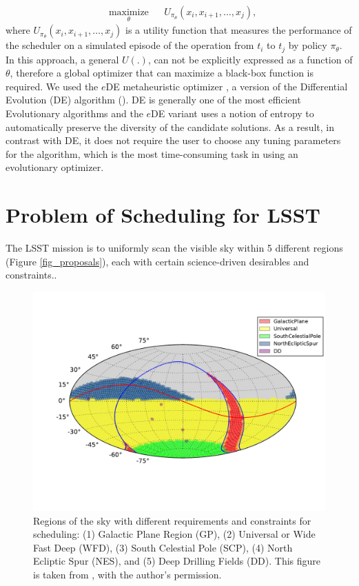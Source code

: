 \documentclass[12pt,aas_macros]{article}
\theoremstyle{definition}
\begin{document}
\begin{equation}%
\begin{aligned}
& \underset{\theta}{\text{maximize}}
& & U_{\pi_{\theta}}(x_i,x_{i+1}, \dots, x_{j}),
\end{aligned}
\end{equation}
where $U_{\pi_{\theta}}(x_i,x_{i+1}, \dots, x_{j})$ is a utility function that measures the performance of the scheduler on a simulated episode of the operation from $t_i$ to $t_j$ by policy $\pi_{\theta}$. In this approach, a general $U(.)$, can not be explicitly expressed as a function of $\theta$, therefore a global optimizer that can maximize a black-box function is required. We used the $e$DE metaheuristic optimizer \cite{naghib2016entropic}, a version of the Differential Evolution (DE) algorithm (\cite{storn1997differential}). DE is generally one of the most efficient Evolutionary algorithms and the $e$DE variant uses a notion of entropy to automatically preserve the diversity of the candidate solutions. As a result, in contrast with DE, it does not require the user to choose any tuning parameters for the algorithm, which is the most time-consuming task in using an evolutionary optimizer.


\section{Problem of Scheduling for LSST}\label{sec_lsst_problem}

The LSST mission is to uniformly scan the visible sky within 5 different regions (Figure \ref{fig_proposals}), each with certain science-driven desirables and constraints..

\begin{figure}[h!]
\begin{center}
\includegraphics[width=.6\linewidth]{minion_1016_proposal_footprint.pdf}
\caption{Regions of the sky with different requirements and constraints for scheduling: (1) Galactic Plane Region (GP), (2) Universal or Wide Fast Deep (WFD), (3) South Celestial Pole (SCP), (4) North Ecliptic Spur (NES), and (5) Deep Drilling Fields (DD). This figure is taken from \cite{jones2017large}, with the author's permission.}
\end{center}
\end{figure}\label{fig_proposals}
\end{document}
